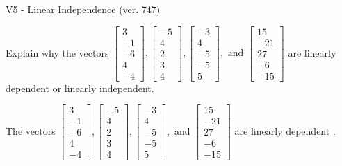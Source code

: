\begin{exercise}
  \begin{exerciseTitle}V5 - Linear Independence (ver. 747)\end{exerciseTitle}
  \begin{exerciseStatement}
    Explain why the vectors \(\left[\begin{array}{r}
3 \\
-1 \\
-6 \\
4 \\
-4
\end{array}\right] , \left[\begin{array}{r}
-5 \\
4 \\
2 \\
3 \\
4
\end{array}\right] , \left[\begin{array}{r}
-3 \\
4 \\
-5 \\
-5 \\
5
\end{array}\right] , \text{ and } \left[\begin{array}{r}
15 \\
-21 \\
27 \\
-6 \\
-15
\end{array}\right]\) are linearly dependent or linearly independent.	


  \end{exerciseStatement}
  \begin{exerciseAnswer}
   The vectors \(\left[\begin{array}{r}
3 \\
-1 \\
-6 \\
4 \\
-4
\end{array}\right] , \left[\begin{array}{r}
-5 \\
4 \\
2 \\
3 \\
4
\end{array}\right] , \left[\begin{array}{r}
-3 \\
4 \\
-5 \\
-5 \\
5
\end{array}\right] , \text{ and } \left[\begin{array}{r}
15 \\
-21 \\
27 \\
-6 \\
-15
\end{array}\right]\) are 
  	 linearly dependent  .
  


  \end{exerciseAnswer}
\end{exercise}